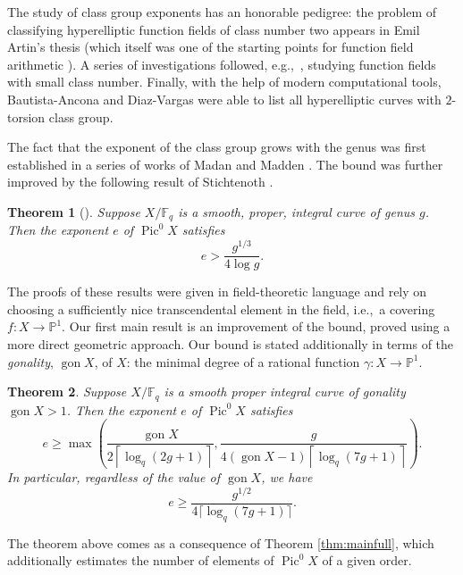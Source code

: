 \documentclass[11pt]{amsart}
\newcommand{\F}{\mathbb{F}}
\newcommand{\PP}{\mathbb{P}}
\DeclareMathOperator{\Pic}{Pic}
\newcommand{\gon}{\operatorname{gon}}
\newtheorem{theorem}{Theorem}[section]
\theoremstyle{definition}
\theoremstyle{remark}
\begin{document}
The study of class group exponents has an honorable pedigree: the problem of classifying hyperelliptic function fields of class number two appears in Emil Artin's thesis \cite{ArtinThesis1, ArtinThesis2} (which itself was one of the starting points for function field arithmetic \cite{RoquetteBook, oort2016early}). A series of investigations followed, e.g.,~\cite{LeitzelMadanQueen, MaddenQuadratic}, studying function fields with small class number. Finally, with the help of modern computational tools, Bautista-Ancona and Diaz-Vargas \cite{BautistsaAnconaDiazVargas} were able to list all hyperelliptic curves with $2$-torsion class group.

The fact that the exponent of the class group grows with the genus was first established in a series of works of Madan and Madden \cite{MadanMadden1976, MadanMadden1977, MadanMadden1977_degree}. The bound was further improved by the following result of Stichtenoth \cite{Stichtenoth1979}.

\begin{theorem}[]
Suppose $X/\F_q$ is a smooth, proper, integral curve of genus $g$. Then the exponent $e$ of $\Pic^0 X$ satisfies 
    \[e > \frac{g^{1/3}}{4 \log g}.\]
\end{theorem}

The proofs of these results were given in field-theoretic language and rely on choosing a sufficiently nice transcendental element in the field, i.e.,~a covering $f: X \to \PP^1$. Our first main result is an improvement of the bound, proved using a more direct geometric approach. Our bound is stated additionally in terms of the \emph{gonality}, $\gon X$, of $X$: the minimal degree of a rational function $\gamma: X \to \PP^1$. 
\begin{theorem}\label{thm:exponent}
    Suppose $X/\F_q$ is a smooth proper integral curve of gonality $\gon X>1$. Then the exponent $e$ of $\Pic^0 X$ satisfies
    \[e \geqslant \max\left(\frac{\gon X}{2\left\lceil\log_q (2g+1)\right\rceil}, \frac{g}{4(\gon X -1)\left\lceil\log_q(7g+1)\right\rceil}\right).\]
    In particular, regardless of the value of $\gon X$, we have 
    \[e \geqslant \frac{g^{1/2}}{4\lceil\log_q(7g+1)\rceil}.\]
\end{theorem}

The theorem above comes as a consequence of Theorem \ref{thm:mainfull}, which additionally estimates the number of elements of $\Pic^0 X$ of a given order.
\end{document}
